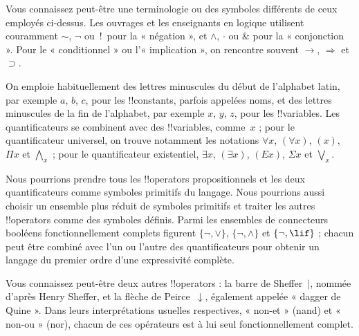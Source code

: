 \documentclass[../../../include/open-logic-section]{subfiles}
\begin{document}
\begin{intro}
Vous connaissez peut-être une terminologie ou des symboles différents
de ceux employés ci-dessus. Les ouvrages et les enseignants en logique
utilisent couramment $\sim$, $\neg$ ou~!\ pour la « négation », et
$\wedge$, $\cdot$ ou $\&$ pour la « conjonction ». Pour le
« conditionnel » ou l'« implication », on rencontre souvent
$\rightarrow$, $\Rightarrow$ et $\supset$.

On emploie habituellement des lettres minuscules du début de
l'alphabet latin, par exemple $a$, $b$, $c$, pour les !!{constant}s,
parfois appelées noms, et des lettres minuscules de la fin de
l'alphabet, par exemple $x$, $y$, $z$, pour les !!{variable}s. Les
quantificateurs se combinent avec des !!{variable}s, comme~$x$ ;
pour le quantificateur universel, on trouve notamment les notations
$\forall x$, $(\forall x)$, $(x)$, $\Pi x$ et $\bigwedge_x$ ; pour
le quantificateur existentiel, $\exists x$, $(\exists x)$, $(Ex)$,
$\Sigma x$ et $\bigvee_x$.
\end{intro}

\begin{explain}
Nous pourrions prendre tous les !!{operator}s propositionnels et les
deux quantificateurs comme symboles primitifs du langage. Nous
pourrions aussi choisir un ensemble plus réduit de symboles primitifs
et traiter les autres !!{operator}s comme des symboles définis. Parmi
les ensembles de connecteurs booléens fonctionnellement complets
figurent $\{ \lnot, \lor \}$, $\{ \lnot, \land \}$ et
$\{ \lnot, \lif\}$ ; chacun peut être combiné avec l'un ou l'autre
des quantificateurs pour obtenir un langage du premier ordre d'une
expressivité complète.

Vous connaissez peut-être deux autres !!{operator}s : la barre de
Sheffer~$|$, nommée d'après Henry Sheffer, et la flèche de
Peirce~$\downarrow$, également appelée « dagger de Quine ». Dans
leurs interprétations usuelles respectives, « non-et » (nand) et
« non-ou » (nor), chacun de ces opérateurs est à lui seul
fonctionnellement complet.
\end{explain}
\end{document}
